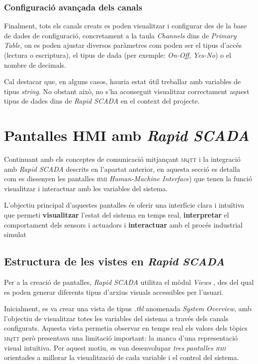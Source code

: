 \documentclass[a4paper,11pt,DIV=13,headings=normal,abstract=true,twoside=semi]{article}
\newcommand{\acro}[1]{\textsc{#1}}
\begin{document}
\subsubsection*{Configuració avançada dels canals}

Finalment, tots els canals creats es poden visualitzar i configurar des de la base de dades de configuració, concretament a la taula \emph{Channels} dins de \emph{Primary Table}, on es poden ajustar diversos paràmetres com poden ser el tipus d'accés (lectura o escriptura), el tipus de dada (per exemple: \emph{On-Off}, \emph{Yes-No}) o el nombre de decimals. 

Cal destacar que, en alguns casos, hauria estat útil treballar amb variables de tipus \emph{string}. No obstant això, no s'ha aconseguit visualitzar correctament aquest tipus de dades dins de \emph{Rapid SCADA} en el context del projecte.

\newpage
\section{Pantalles HMI amb \emph{Rapid SCADA}}
\label{sec:hmi}
Continuant amb els conceptes de comunicació mitjançant \acro{mqtt}  i la integració amb \emph{Rapid SCADA} descrits en l'apartat anterior, en aquesta secció es detalla com es dissenyen les pantalles \acro{hmi} \emph{Human-Machine Interface}) que tenen la funció visualitzar i interactuar amb les variables del sistema.

L'objectiu principal d'aquestes pantalles és oferir una interfície clara i intuïtiva que permeti \textbf{visualitzar} l'estat del sistema en temps real, \textbf{interpretar} el comportament dels sensors i actuadors i \textbf{interactuar} amb el procés industrial simulat

\subsection{Estructura de les vistes en \emph{Rapid SCADA}}

Per a la creació de pantalles, \emph{Rapid SCADA} utilitza el mòdul \emph{Views} \cite{rapidscada_views}, des del qual es poden generar diferents tipus d'arxius visuals accessibles per l'usuari.

Inicialment, es va crear una vista de tipus \emph{.tbl} anomenada \emph{System Overview}, amb l'objectiu de visualitzar totes les variables del sistema a través dels canals configurats. Aquesta vista permetia observar en temps real els valors dels tòpics \acro{mqtt}  però presentava una limitació important: la manca d'una representació visual intuïtiva. Per aquest motiu, es van desenvolupar \emph{tres pantalles \acro{hmi}} orientades a millorar la visualització de cada variable i el control del sistema.
\end{document}
